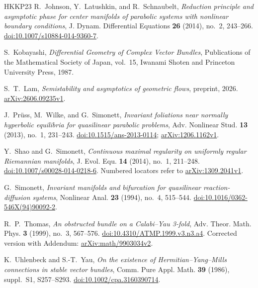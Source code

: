 \begin{thebibliography}{HKKP23}
R.~Johnson, Y.~Latushkin, and R.~Schnaubelt,
\emph{Reduction principle and asymptotic phase for center manifolds of parabolic systems with nonlinear boundary conditions},
J. Dynam. Differential Equations \textbf{26} (2014), no.~2, 243--266.
\href{https://doi.org/10.1007/s10884-014-9360-7}{doi:10.1007/s10884-014-9360-7}.

S.~Kobayashi, \emph{Differential Geometry of Complex Vector Bundles},
Publications of the Mathematical Society of Japan, vol.~15,
Iwanami Shoten and Princeton University Press, 1987.

S.~T.~Lam, \emph{Semistability and asymptotics of geometric flows},
preprint, 2026.
\href{https://arxiv.org/abs/2606.09235v1}{arXiv:2606.09235v1}.

J.~Pr\"uss, M.~Wilke, and G.~Simonett,
\emph{Invariant foliations near normally hyperbolic equilibria for quasilinear parabolic problems},
Adv. Nonlinear Stud. \textbf{13} (2013), no.~1, 231--243.
\href{https://doi.org/10.1515/ans-2013-0114}{doi:10.1515/ans-2013-0114};
\href{https://arxiv.org/abs/1206.1162v1}{arXiv:1206.1162v1}.

Y.~Shao and G.~Simonett,
\emph{Continuous maximal regularity on uniformly regular Riemannian manifolds},
J. Evol. Equ. \textbf{14} (2014), no.~1, 211--248.
\href{https://doi.org/10.1007/s00028-014-0218-6}{doi:10.1007/s00028-014-0218-6}.
Numbered locators refer to
\href{https://arxiv.org/abs/1309.2041v1}{arXiv:1309.2041v1}.

G.~Simonett,
\emph{Invariant manifolds and bifurcation for quasilinear reaction-diffusion systems},
Nonlinear Anal. \textbf{23} (1994), no.~4, 515--544.
\href{https://doi.org/10.1016/0362-546X(94)90092-2}{doi:10.1016/0362-546X(94)90092-2}.

R.~P.~Thomas, \emph{An obstructed bundle on a Calabi--Yau 3-fold},
Adv. Theor. Math. Phys. \textbf{3} (1999), no.~3, 567--576.
\href{https://doi.org/10.4310/ATMP.1999.v3.n3.a4}{doi:10.4310/ATMP.1999.v3.n3.a4}.
Corrected version with Addendum:
\href{https://arxiv.org/abs/math/9903034v2}{arXiv:math/9903034v2}.

K.~Uhlenbeck and S.-T.~Yau,
\emph{On the existence of Hermitian--Yang--Mills connections in stable vector bundles},
Comm. Pure Appl. Math. \textbf{39} (1986), suppl.~S1, S257--S293.
\href{https://doi.org/10.1002/cpa.3160390714}{doi:10.1002/cpa.3160390714}.


\end{thebibliography}
